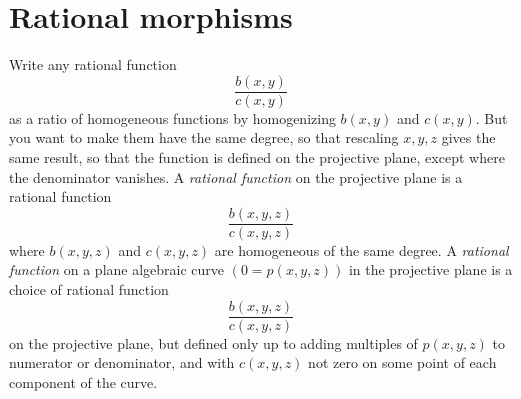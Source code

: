\section{Rational morphisms}
Write any rational function
\[
\frac{b(x,y)}{c(x,y)}
\]
as a ratio of homogeneous functions by homogenizing \(b(x,y)\) and \(c(x,y)\).
But you want to make them have the same degree, so that rescaling \(x,y,z\) gives the same result, so that the function is defined on the projective plane, except where the denominator vanishes.
A \emph{rational function} on the projective plane is a rational function 
\[
\frac{b(x,y,z)}{c(x,y,z)}
\]
where \(b(x,y,z)\) and \(c(x,y,z)\) are homogeneous of the same degree.
A \emph{rational function} on a plane algebraic curve \((0=p(x,y,z))\) in the projective plane is a choice of rational function
\[
\frac{b(x,y,z)}{c(x,y,z)}
\]
on the projective plane, but defined only up to adding multiples of \(p(x,y,z)\) to numerator or denominator, and with \(c(x,y,z)\) not zero on some point of each component of the curve.

